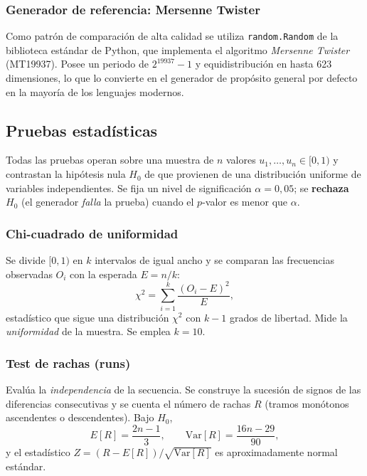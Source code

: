 \documentclass[11pt]{article}
\begin{document}
\subsubsection{Generador de referencia: Mersenne Twister}

Como patr\'on de comparaci\'on de alta calidad se utiliza
\texttt{random.Random} de la biblioteca est\'andar de Python, que
implementa el algoritmo \emph{Mersenne Twister} (MT19937). Posee un
periodo de $2^{19937}-1$ y equidistribuci\'on en hasta 623 dimensiones,
lo que lo convierte en el generador de prop\'osito general por defecto en
la mayor\'ia de los lenguajes modernos.

\subsection{Pruebas estad\'isticas}

Todas las pruebas operan sobre una muestra de $n$ valores
$u_1,\dots,u_n \in [0,1)$ y contrastan la hip\'otesis nula $H_0$ de que
provienen de una distribuci\'on uniforme de variables independientes. Se
fija un nivel de significaci\'on $\alpha = 0{,}05$; se \textbf{rechaza}
$H_0$ (el generador \emph{falla} la prueba) cuando el $p$-valor es menor
que $\alpha$.

\subsubsection{Chi-cuadrado de uniformidad}

Se divide $[0,1)$ en $k$ intervalos de igual ancho y se comparan las
frecuencias observadas $O_i$ con la esperada $E = n/k$:
\begin{equation}
\chi^2 = \sum_{i=1}^{k} \frac{(O_i - E)^2}{E},
\end{equation}
estad\'istico que sigue una distribuci\'on $\chi^2$ con $k-1$ grados de
libertad. Mide la \emph{uniformidad} de la muestra. Se emplea $k=10$.

\subsubsection{Test de rachas (runs)}

Eval\'ua la \emph{independencia} de la secuencia. Se construye la sucesi\'on
de signos de las diferencias consecutivas y se cuenta el n\'umero de
rachas $R$ (tramos mon\'otonos ascendentes o descendentes). Bajo $H_0$,
\begin{equation}
E[R] = \frac{2n-1}{3}, \qquad
\mathrm{Var}[R] = \frac{16n-29}{90},
\end{equation}
y el estad\'istico $Z = (R - E[R])/\sqrt{\mathrm{Var}[R]}$ es
aproximadamente normal est\'andar.
\end{document}
